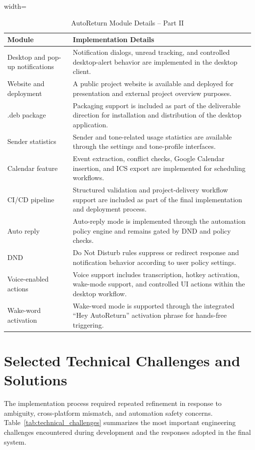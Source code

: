 \begin{table}[!htbp]
\centering
\caption{AutoReturn Module Details -- Part II}
\footnotesize
\renewcommand{\arraystretch}{1.15}
\setlength{\tabcolsep}{5pt}
\begin{adjustbox}{width=\textwidth}
\begin{tabular}{|>{\raggedright\arraybackslash}p{4.8cm}|>{\raggedright\arraybackslash}p{8.7cm}|}
\hline
\textbf{Module} & \textbf{Implementation Details} \\
\hline
Desktop and pop-up notifications & Notification dialogs, unread tracking, and controlled desktop-alert behavior are implemented in the desktop client. \\
\hline
Website and deployment & A public project website is available and deployed for presentation and external project overview purposes. \\
\hline
.deb package & Packaging support is included as part of the deliverable direction for installation and distribution of the desktop application. \\
\hline
Sender statistics & Sender and tone-related usage statistics are available through the settings and tone-profile interfaces. \\
\hline
Calendar feature & Event extraction, conflict checks, Google Calendar insertion, and ICS export are implemented for scheduling workflows. \\
\hline
CI/CD pipeline & Structured validation and project-delivery workflow support are included as part of the final implementation and deployment process. \\
\hline
Auto reply & Auto-reply mode is implemented through the automation policy engine and remains gated by DND and policy checks. \\
\hline
DND & Do Not Disturb rules suppress or redirect response and notification behavior according to user policy settings. \\
\hline
Voice-enabled actions & Voice support includes transcription, hotkey activation, wake-mode support, and controlled UI actions within the desktop workflow. \\
\hline
Wake-word activation & Wake-word mode is supported through the integrated ``Hey AutoReturn'' activation phrase for hands-free triggering. \\
\hline
\end{tabular}
\end{adjustbox}
\end{table}

\section{Selected Technical Challenges and Solutions}
The implementation process required repeated refinement in response to ambiguity, cross-platform mismatch, and automation safety concerns. Table~\ref{tab:technical_challenges} summarizes the most important engineering challenges encountered during development and the responses adopted in the final system.

